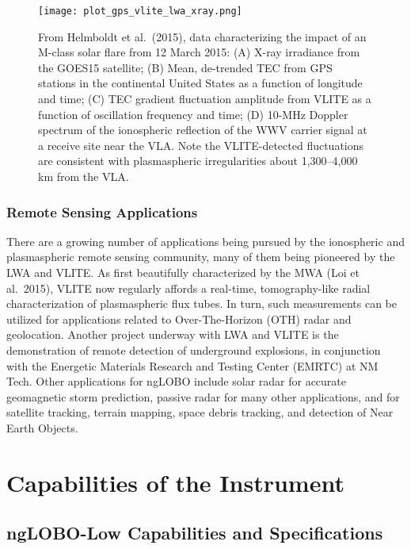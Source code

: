 \documentclass[11pt]{article}
\begin{document}
\begin{figure}
\texttt{[image: plot\_gps\_vlite\_lwa\_xray.png]}
\caption{From Helmboldt et al.\ (2015), data characterizing the impact of an M-class solar flare from 12 March 2015: (A) X-ray irradiance from the GOES15 satellite; (B) Mean, de-trended TEC from GPS stations in the continental United States as a function of longitude and time; (C) TEC gradient fluctuation amplitude from VLITE as a function of oscillation frequency and time; (D) 10-MHz Doppler spectrum of the ionospheric reflection of the WWV carrier signal at a receive site near the VLA.  Note the VLITE-detected fluctuations are consistent with plasmaspheric irregularities about 1,300--4,000 km from the VLA.}
\label{flare}
\end{figure}

\subsubsection{Remote Sensing Applications}

There are a growing number of applications being pursued by the ionospheric and plasmaspheric remote sensing community, many of them being pioneered by the LWA and VLITE. As first beautifully characterized by the MWA (Loi et al.\ 2015), VLITE now regularly affords a real-time, tomography-like radial characterization of plasmaspheric flux tubes. In turn, such measurements can be utilized for applications related to Over-The-Horizon (OTH) radar and geolocation. Another project underway with LWA and VLITE is the demonstration of remote detection of underground explosions, in conjunction with the Energetic Materials Research and Testing Center (EMRTC) at NM Tech. Other applications for ngLOBO include solar radar for accurate geomagnetic storm prediction, passive radar for many other applications, and for satellite tracking, terrain mapping, space debris tracking, and detection of Near Earth Objects.




\vspace{-0.5cm}
\section{Capabilities of the Instrument}
\vspace{-0.25cm}

\subsection{ngLOBO-Low Capabilities and Specifications}
\end{document}
